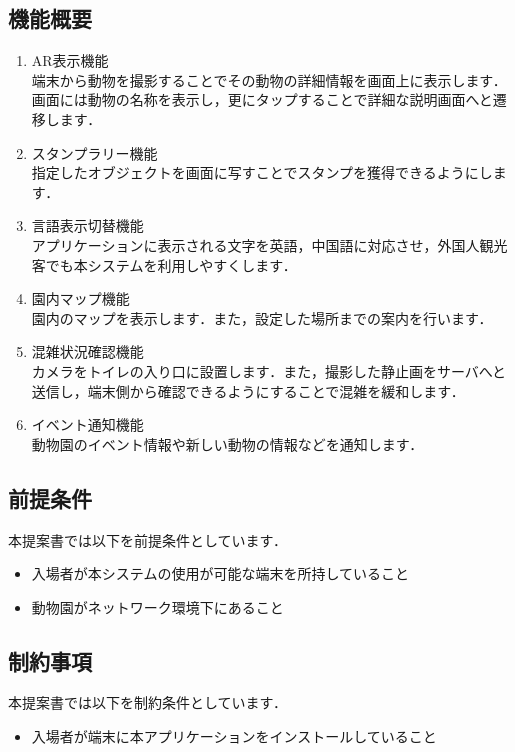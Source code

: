 \documentclass[a4j]{jarticle}
\begin{document}
\subsection{機能概要}
\begin{enumerate}
	\item AR表示機能\\
	端末から動物を撮影することでその動物の詳細情報を画面上に表示します．画面には動物の名称を表示し，更にタップすることで詳細な説明画面へと遷移します．
	\item スタンプラリー機能\\
	指定したオブジェクトを画面に写すことでスタンプを獲得できるようにします．
	\item 言語表示切替機能\\
	アプリケーションに表示される文字を英語，中国語に対応させ，外国人観光客でも本システムを利用しやすくします．
	\item 園内マップ機能\\
	園内のマップを表示します．また，設定した場所までの案内を行います．
	\item 混雑状況確認機能\\
	カメラをトイレの入り口に設置します．また，撮影した静止画をサーバへと送信し，端末側から確認できるようにすることで混雑を緩和します．
	\item イベント通知機能\\
	動物園のイベント情報や新しい動物の情報などを通知します．
\end{enumerate}

\subsection{前提条件}
本提案書では以下を前提条件としています．
\begin{itemize}
	\item 入場者が本システムの使用が可能な端末を所持していること
	\item 動物園がネットワーク環境下にあること
\end{itemize}

\subsection{制約事項}
本提案書では以下を制約条件としています．
\begin{itemize}
	\item 入場者が端末に本アプリケーションをインストールしていること
\end{itemize}
\end{document}
